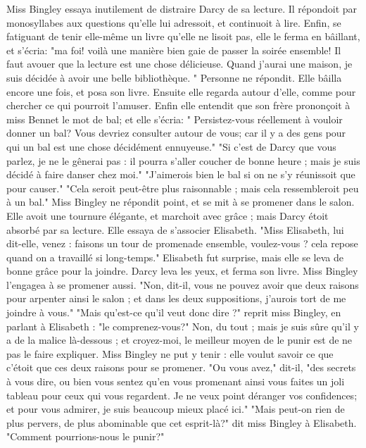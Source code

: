 Miss Bingley essaya inutilement de distraire Darcy de sa lecture. Il répondoit par monosyllabes aux questions qu'elle lui adressoit, et continuoit à lire. Enfin, se fatiguant de tenir elle-même un livre qu'elle ne lisoit pas, elle le ferma en bâillant, et s'écria: "ma foi! voilà une manière bien gaie de passer la soirée ensemble! Il faut avouer que la lecture est une chose délicieuse. Quand j'aurai une maison, je suis décidée à avoir une belle bibliothèque. "
Personne ne répondit. Elle bâilla encore une fois, et posa son livre. Ensuite elle regarda autour d'elle, comme pour chercher ce qui pourroit l'amuser. Enfin elle entendit que son frère prononçoit à miss Bennet le mot de bal; et elle s'écria: " Persistez-vous réellement à vouloir donner un bal? Vous devriez consulter autour de vous; car il y a des gens pour qui un bal est une chose décidément ennuyeuse."
\setcounter{page}{396}
"Si c'est de Darcy que vous parlez, je ne le gênerai pas : il pourra s'aller coucher de bonne heure ; mais je suis décidé à faire danser chez moi."
"J'aimerois bien le bal si on ne s'y réunissoit que pour causer."
"Cela seroit peut-être plus raisonnable ; mais cela ressembleroit peu à un bal."
Miss Bingley ne répondit point, et se mit à se promener dans le salon. Elle avoit une tournure élégante, et marchoit avec grâce ; mais Darcy étoit absorbé par sa lecture. Elle essaya de s'associer Elisabeth. "Miss Elisabeth, lui dit-elle, venez : faisons un tour de promenade ensemble, voulez-vous ? cela repose quand on a travaillé si long-temps."
Elisabeth fut surprise, mais elle se leva de bonne grâce pour la joindre. Darcy leva les yeux, et ferma son livre. Miss Bingley l'engagea à se promener aussi. "Non, dit-il, vous ne pouvez avoir que deux raisons pour arpenter ainsi le salon ; et dans les deux suppositions, j'aurois tort de me joindre à vous."
"Mais qu'est-ce qu'il veut donc dire ?" reprit miss Bingley, en parlant à Elisabeth : "le comprenez-vous?"
Non, du tout ; mais je suis sûre qu'il y a de la malice là-dessous ; et croyez-moi, le meilleur moyen de le punir est de ne pas le faire expliquer.
\setcounter{page}{397}
Miss Bingley ne put y tenir : elle voulut savoir ce que c'étoit que ces deux raisons pour se promener.
"Ou vous avez," dit-il, "des secrets à vous dire, ou bien vous sentez qu'en vous promenant ainsi vous faites un joli tableau pour ceux qui vous regardent. Je ne veux point déranger vos confidences; et pour vous admirer, je suis beaucoup mieux placé ici."
"Mais peut-on rien de plus pervers, de plus abominable que cet esprit-là?" dit miss Bingley à Elisabeth. "Comment pourrions-nous le punir?"
